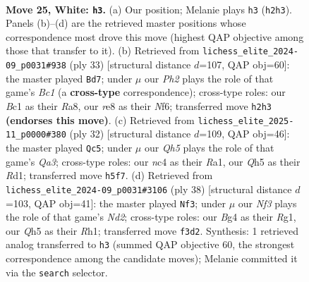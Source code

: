 \documentclass[11pt]{article}
\begin{document}
\begin{figure}[p]
\label{fig:thought-m46}
\end{figure}

\clearpage

\begin{figure}[p]\centering
\begin{subfigure}{0.46\textwidth}\centering
\resizebox{\linewidth}{!}{%
\newchessgame
\chessboard[
  setfen={2bqrb1k/rp1p3p/p3pp2/2P4Q/P1nP2B1/2N2N2/1P3P1P/R1B2RK1 w - - 1 25},
  showmover=false,
  pgfstyle=straightmove, color=movearrow, markmove={h2-h3}
]}
\caption{}
\end{subfigure}\hfill
\begin{subfigure}{0.46\textwidth}\centering
\resizebox{\linewidth}{!}{%
\newchessgame
\chessboard[
  setfen={r1b2rk1/pp3pbp/5np1/3p4/P2B3P/1N3Pq1/1PPQ2P1/1K1R1B1R b - - 3 17},
  showmover=false,
  pgfstyle=straightmove, color=movearrow, markmove={c8-d7}
]}
\caption{}
\end{subfigure}
\\[4pt]
\begin{subfigure}{0.46\textwidth}\centering
\resizebox{\linewidth}{!}{%
\newchessgame
\chessboard[
  setfen={r1bq1rk1/5pbp/p1n3p1/1p1p4/2p2B2/Q1P1PN2/PP2BPPP/R2R2K1 w - - 0 17},
  showmover=false,
  pgfstyle=straightmove, color=movearrow, markmove={a3-c5}
]}
\caption{}
\end{subfigure}\hfill
\begin{subfigure}{0.46\textwidth}\centering
\resizebox{\linewidth}{!}{%
\newchessgame
\chessboard[
  setfen={r2bq1k1/1p5n/2pp1rp1/p3p3/PnP1P1Q1/2N1B3/1PPN1P2/2K3RR w - - 0 20},
  showmover=false,
  pgfstyle=straightmove, color=movearrow, markmove={d2-f3}
]}
\caption{}
\end{subfigure}
\caption{\textbf{Move 25, White: \texttt{h3}.} (a) Our position; Melanie plays \texttt{h3} (\texttt{h2h3}). Panels (b)--(d) are the retrieved master positions whose correspondence most drove this move (highest QAP objective among those that transfer to it). (b) Retrieved from \texttt{lichess\_elite\_2024-09\_p0031\#938} (ply 33) [structural distance $d$=107, QAP obj=60]: the master played \texttt{Bd7}; under $\mu$ our \emph{Ph2} plays the role of that game's \emph{Bc1} (a \textbf{cross-type} correspondence); cross-type roles: our \emph{B}c1 as their \emph{R}a8, our \emph{r}e8 as their \emph{N}f6; transferred move \texttt{h2h3} \textbf{(endorses this move)}. (c) Retrieved from \texttt{lichess\_elite\_2025-11\_p0000\#380} (ply 32) [structural distance $d$=109, QAP obj=46]: the master played \texttt{Qc5}; under $\mu$ our \emph{Qh5} plays the role of that game's \emph{Qa3}; cross-type roles: our \emph{n}c4 as their \emph{R}a1, our \emph{Q}h5 as their \emph{R}d1; transferred move \texttt{h5f7}. (d) Retrieved from \texttt{lichess\_elite\_2024-09\_p0031\#3106} (ply 38) [structural distance $d$=103, QAP obj=41]: the master played \texttt{Nf3}; under $\mu$ our \emph{Nf3} plays the role of that game's \emph{Nd2}; cross-type roles: our \emph{B}g4 as their \emph{R}g1, our \emph{Q}h5 as their \emph{R}h1; transferred move \texttt{f3d2}. Synthesis: 1 retrieved analog transferred to \texttt{h3} (summed QAP objective 60, the strongest correspondence among the candidate moves); Melanie committed it via the \texttt{search} selector.}

\end{figure}
\end{document}
